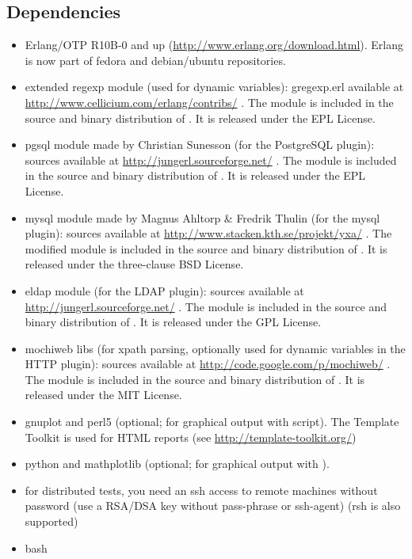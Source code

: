\documentclass{TSUNG-en}
\begin{document}
\subsection{Dependencies}
\begin{itemize}
\item Erlang/OTP R10B-0 and up
  (\url{http://www.erlang.org/download.html}). Erlang is now
  part of fedora and debian/ubuntu repositories.
  \item extended regexp module (used for dynamic variables):
    gregexp.erl available at
    \url{http://www.cellicium.com/erlang/contribs/} . The module is
    included in the source and binary distribution of . It
    is released under the EPL License.
  \item pgsql module made by Christian Sunesson (for the PostgreSQL plugin):
    sources available at
    \url{http://jungerl.sourceforge.net/} . The module is
    included in the source and binary distribution of . It
    is released under the EPL License.
  \item mysql module made by Magnus Ahltorp \& Fredrik Thulin  (for the mysql plugin):
    sources available at
    \url{http://www.stacken.kth.se/projekt/yxa/} . The modified module is
    included in the source and binary distribution of . It
    is released under the three-clause BSD License.
  \item eldap module  (for the LDAP plugin):
    sources available at
    \url{http://jungerl.sourceforge.net/} . The module is
    included in the source and binary distribution of . It
    is released under the GPL License.
  \item mochiweb libs (for xpath parsing, optionally used for dynamic variables in
    the HTTP plugin):
    sources available at
    \url{http://code.google.com/p/mochiweb/} . The module is
    included in the source and binary distribution of . It
    is released under the MIT License.
   \item  gnuplot and perl5 (optional; for graphical output with
     script).  The Template Toolkit is used for HTML
    reports (see \url{http://template-toolkit.org/})
   \item  python and mathplotlib (optional; for graphical output with
    ).
  \item for distributed tests, you need an ssh access to remote
    machines without password (use a RSA/DSA key without pass-phrase or
    ssh-agent) (rsh is also supported)
\item bash
\end{itemize}
\end{document}
